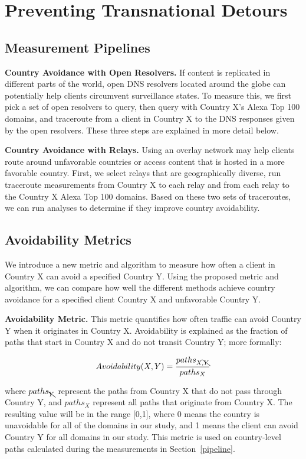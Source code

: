 \section{Preventing Transnational Detours}
\label{avoid_results}

\subsection{Measurement Pipelines}
{\bf Country Avoidance with Open Resolvers.} If content is replicated in different parts of the world, open DNS resolvers located around the globe can potentially help clients circumvent surveillance states.  To measure this, we first pick a set of open resolvers to query, then query with Country X's Alexa Top 100 domains, and traceroute from a client in Country X to the DNS responses given by the open resolvers.  These three steps are explained in more detail below.

{\bf Country Avoidance with Relays.} Using an overlay network may help clients route around unfavorable countries or access content that is hosted in a more favorable country.  First, we select relays that are geographically diverse, run traceroute measurements from Country X to each relay and from each relay to the Country X Alexa Top 100 domains.  Based on these two sets of traceroutes, we can run analyses to determine if they improve country avoidability. 

\subsection{Avoidability Metrics}
\label{metrics}
We introduce a new metric and algorithm to measure how often a client in Country X can avoid a specified Country Y.  Using the proposed metric and algorithm, we can compare how well the different methods achieve country avoidance for a specified client Country X and unfavorable Country Y.

{\bf Avoidability Metric.}  This metric quantifies how often traffic can avoid Country Y when it originates in Country X.  Avoidability is explained as the fraction of paths that start in Country X and do not transit Country Y; more formally:

\[Avoidability(X,Y) = \frac{paths_{X,\bcancel{Y}}}{paths_{X}}\]

where $paths_{\bcancel{Y}}$ represent the paths from Country X that do not pass through Country Y, and $paths_{X}$ represent all paths that originate from Country X. The resulting value will be in the range [0,1], where 0 means the country is unavoidable for all of the domains in our study, and 1 means the client can avoid Country Y for all domains in our study.  This metric is used on country-level paths calculated during the measurements in Section~\ref{pipeline}.

